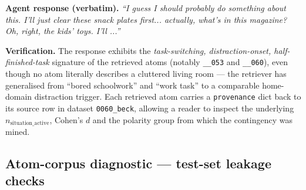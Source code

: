 \textbf{Agent response (verbatim).} \textit{``I guess I should probably do something about this. I'll just clear these snack plates first... actually, what's in this magazine? Oh, right, the kids' toys. I'll ...''}

\textbf{Verification.} The response exhibits the \textit{task-switching, distraction-onset, half-finished-task} signature of the retrieved atoms (notably \texttt{\_\allowbreak{}\_\allowbreak{}053} and \texttt{\_\allowbreak{}\_\allowbreak{}060}), even though no atom literally describes a cluttered living room --- the retriever has generalised from ``bored schoolwork'' and ``work task'' to a comparable home-domain distraction trigger. Each retrieved atom carries a \texttt{provenance} dict back to its source row in dataset \texttt{0060\_\allowbreak{}beck}, allowing a reader to inspect the underlying $n_\text{situation\_active}$, Cohen's $d$ and the polarity group from which the contingency was mined.

\subsection{Atom-corpus diagnostic --- test-set leakage checks}
\label{app:A.4}

